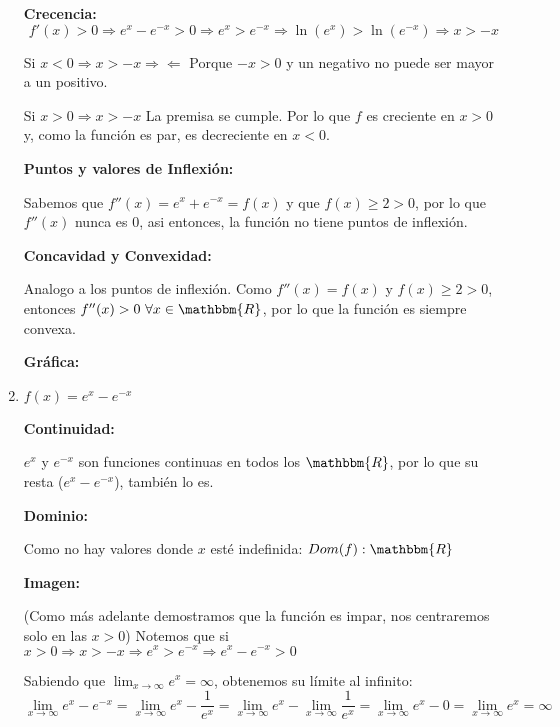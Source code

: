 \documentclass[12pt]{article}
\begin{document}
\begin{enumerate}[\hspace{9px} a)]
        \textbf{Crecencia: }
        \begin{equation*}
            f'(x)>0 \Rightarrow e^x-e^{-x}>0 \Rightarrow e^x>e^{-x} \Rightarrow \ln(e^x)>\ln(e^{-x}) \Rightarrow x>-x
        \end{equation*}

        Si \(x<0 \Rightarrow x>-x\Rightarrow\!\Leftarrow\) Porque \(-x>0\) y un negativo no puede ser mayor a un positivo.\medskip

        Si \(x>0 \Rightarrow x>-x\) La premisa se cumple. Por lo que \(f\) es creciente en \(x>0\) y, como la funci\'on es par, es decreciente en \(x<0\).\medskip

        \textbf{Puntos y valores de Inflexi\'on: }\medskip

            Sabemos que \(f''(x)=e^x+e^{-x}=f(x)\) y que \(f(x)\geq2>0\), por lo que \(f''(x)\) nunca es 0, asi entonces, la funci\'on no tiene puntos de inflexi\'on.\medskip

        \textbf{Concavidad y Convexidad: }

            Analogo a los puntos de inflexi\'on. Como \(f''(x)=f(x)\) y \(f(x)\geq2>0\), entonces \(f''(x)>0 \ \forall x\in\mathbbm{R}\), por lo que la funci\'on es siempre convexa.\medskip

        \textbf{Gr\'afica: }

    \item \(f(x)=e^x-e^{-x}\)\medskip
    
        \textbf{Continuidad: }\medskip

            \(e^x\) y \(e^{-x}\) son funciones continuas en todos los \(\mathbbm{R}\), por lo que su resta (\(e^x-e^{-x}\)), tambi\'en lo es.\medskip

        \textbf{Dominio: }\medskip

            Como no hay valores donde $x$ est\'e indefinida: \(Dom(f):\mathbbm{R}\)\medskip

        \textbf{Imagen: }\medskip

            (Como m\'as adelante demostramos que la funci\'on es impar, nos centraremos solo en las \(x>0\)) Notemos que si \(x>0 \Rightarrow x>-x \Rightarrow e^x>e^{-x} \Rightarrow e^x-e^{-x}>0\)\medskip

            Sabiendo que \(\lim_{x\to\infty}e^x=\infty\), obtenemos su l\'imite al infinito:
            \begin{equation*}
                \lim_{x\to\infty}e^x-e^{-x}=\lim_{x\to\infty}e^x-\frac{1}{e^x}=\lim_{x\to\infty}e^x-\lim_{x\to\infty}\frac{1}{e^x} = \lim_{x\to\infty}e^x-0=\lim_{x\to\infty}e^x=\infty
            \end{equation*}


\end{enumerate}
\end{document}
